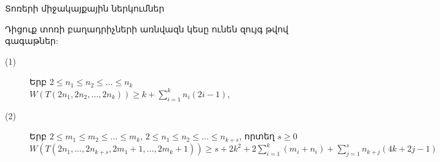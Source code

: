 \begin{frame}{Տոռերի միջակայքային ներկումներ}
\begin{hide}
\begin{theorem}
\label{t2_n_torus}
Դիցուք տոռի բաղադրիչների առնվազն կեսը ունեն զույգ թվով գագաթներ:
\begin{description}
\item[(1)] Երբ $2 \leq n_1 \leq n_2 \leq \ldots \leq n_k$\\
$W\left( {T(2{n_1},2{n_2},\ldots,2{n_k})} \right) \ge k + \sum\limits_{i = 1}^k {{n_i}(2i-1)}$,

\item[(2)] Երբ $2 \leq m_1 \leq m_2 \leq \ldots \leq m_k$, $2 \leq n_1 \leq n_2 \leq \ldots \leq n_{k+s}$, որտեղ $s\geq0$\\ 
$W\left( {T(2{n_1},\ldots,2{n_{k + s}},2{m_1} + 1,\ldots,2{m_k} + 1)} \right) \ge s + 2k^2 + 2\sum\limits_{i=1}^{k}{\left(m_i+n_i\right)} + \sum\limits_{j=1}^{s}{n_{k+j}(4k+2j-1)} $
\end{description}
\end{theorem}
\end{hide}
\end{frame}
